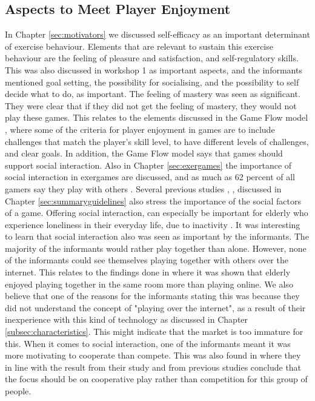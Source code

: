 \subsection{Aspects to Meet Player Enjoyment}
In Chapter \ref{sec:motivators} we discussed self-efficacy as an important determinant of exercise behaviour. Elements that are relevant to sustain this exercise behaviour are the feeling of pleasure and satisfaction, and self-regulatory skills. This was also discussed in workshop 1 as important aspects, and the informants mentioned goal setting, the possibility for socialising, and the possibility to self decide what to do, as important. The feeling of mastery was seen as significant. They were clear that if they did not get the feeling of mastery, they would not play these games. This relates to the elements discussed in the Game Flow model \cite{sweetser}, where some of the criteria for player enjoyment in games are to include challenges that match the player's skill level, to have different levels of challenges, and clear goals. In addition, the Game Flow model says that games should support social interaction. Also in Chapter \ref{sec:exergames} the importance of social interaction in exergames are discussed, and  as much as 62 percent of all gamers say they play with others \cite{statistics2012}. Several previous studies \cite{Billis}, \cite{gerling2}, \cite{gerling1} discussed in Chapter \ref{sec:summaryguidelines} also stress the importance of the social factors of a game. Offering social interaction, can especially be important for elderly who experience loneliness in their everyday life, due to inactivity \cite{project}. It was interesting to learn that social interaction also was seen as important by the informants. The majority of the informants would rather play together than alone. However, none of the informants could see themselves playing together with others over the internet. This relates to the findings done in \cite{Gajadhar} where it was shown that elderly enjoyed playing together in the same room more than playing online. We also believe that one of the reasons for the informants stating this was because they did not understand the concept of "playing over the internet", as a result of their inexperience with this kind of technology as discussed in Chapter \ref{subsec:characteristics}. This might indicate that the market is too immature for this. When it comes to social interaction, one of the informants meant it was more motivating to cooperate than compete. This was also found in \cite{Gajadhar} where they in line with the result from their study and from previous studies conclude that the focus should be on cooperative play rather than competition for this group of people. 

